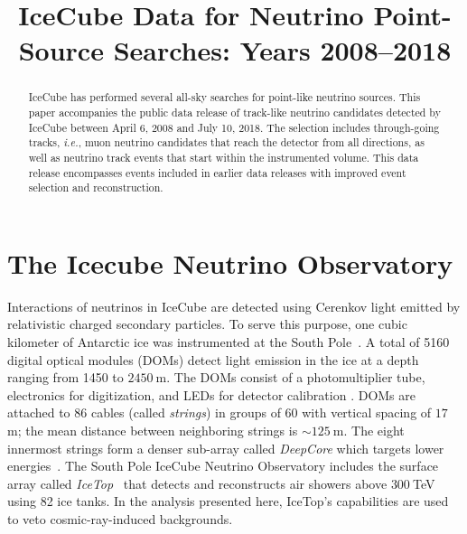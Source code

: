 \documentclass[aps,10pt,prd,twocolumn,floats,letterpaper,showpacs,nofootinbib,bibnotes,notitlepage,superscriptaddress]{revtex4-1}
\begin{document}
\title{IceCube Data for Neutrino Point-Source Searches: Years 2008--2018}



\pacs{}

\begin{abstract}
IceCube has performed several all-sky searches for point-like neutrino sources. This paper accompanies the public data release of track-like neutrino candidates detected by IceCube between April 6, 2008 and July 10, 2018. The selection includes through-going tracks, {\it i.e.}, muon neutrino candidates that reach the detector from all directions, as well as neutrino track events that start within the instrumented volume. This data release encompasses events included in earlier data releases with improved event selection and reconstruction.
\end{abstract}

\maketitle

\section{The Icecube Neutrino Observatory}

Interactions of neutrinos in IceCube are detected using Cerenkov light
emitted by relativistic charged secondary particles. To serve this purpose, one
cubic kilometer of Antarctic ice was instrumented at the South
Pole~\citep{Achterberg:2006md}. A total of 5160 digital optical modules (DOMs)
detect light emission in the ice at a depth ranging from 1450 to $2450\:$m. The
DOMs consist of a photomultiplier tube, electronics for digitization, and LEDs
for detector calibration \citep{Abbasi:2008aa, Abbasi:2010vc}.  DOMs are
attached to 86 cables (called \emph{strings}) in groups of 60 with vertical
spacing of $17\:$m; the mean distance between neighboring strings is
$\sim125\:\mathrm{m}$.  The eight innermost strings form a denser sub-array
called \emph{DeepCore} which targets lower energies~\citep{Abbasi:2011ym}. The
South Pole IceCube Neutrino Observatory includes the surface array called
\emph{IceTop}~\citep{Abbasi:2012nn} that detects and reconstructs air showers
above $300\:$TeV using 82 ice tanks. In the analysis presented here, IceTop's
capabilities are used to veto cosmic-ray-induced backgrounds.
\end{document}
